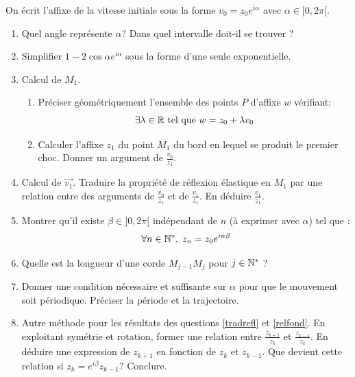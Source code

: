 On écrit l'affixe de la vitesse initiale sous la forme $v_0 = z_0e^{i\alpha}$ avec $\alpha \in [0,2\pi[$.
\begin{enumerate}
  \item Quel angle représente $\alpha$? Dans quel intervalle doit-il se trouver ? 
  \item Simplifier $1-2\cos\alpha e^{i\alpha}$ sous la forme d'une seule exponentielle.
  \item Calcul de $M_1$.
  \begin{enumerate}
\item Préciser géométriquement l'ensemble des points $P$ d'affixe $w$ vérifiant:
\begin{displaymath}
  \exists \lambda \in \mathbb{R} \text{ tel que } w = z_0 + \lambda v_0
\end{displaymath}
\item Calculer l'affixe $z_1$ du point $M_1$ du bord en lequel se produit le premier choc. Donner un argument de $\frac{v_0}{z_1}$.
\end{enumerate}

\item Calcul de $\overrightarrow{v_1}$. \label{tradrefl}Traduire la propriété de réflexion élastique en $M_1$ par une relation entre des arguments de $\frac{v_0}{z_1}$ et de $\frac{v_1}{z_1}$. En déduire $\frac{v_1}{z_1}$.

\item \label{relfond} Montrer qu'il existe $\beta \in ]0,2\pi[$ indépendant de $n$ (à exprimer avec $\alpha$) tel que :
\begin{displaymath}
 \forall n\in \mathbb{N}^{*}, \;z_n = z_0 e^{in\beta}
\end{displaymath}

\item Quelle est la longueur d'une corde $M_{j-1}M_{j}$ pour $j\in \mathbb{N}^{*}$ ?

\item Donner une condition nécessaire et suffisante sur $\alpha$ pour que le mouvement soit périodique. Préciser la période et la trajectoire.

\item Autre méthode pour les résultats des questions \ref{tradrefl} et \ref{relfond}.\newline
En exploitant symétrie et rotation, former une relation entre $\frac{z_{k+1}}{z_k}$ et $\frac{z_{k-1}}{z_k}$. En déduire une expression de $z_{k+1}$ en fonction de $z_k$ et $z_{k-1}$.\newline
Que devient cette relation si $z_k=e^{i\beta}z_{k-1}$? Conclure.  
\end{enumerate}

